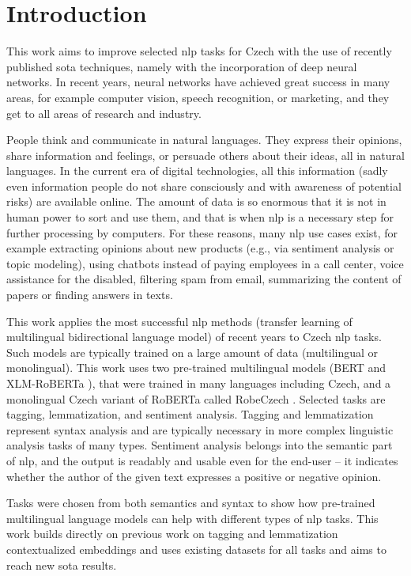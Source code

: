 \chapter*{Introduction}
This work aims to improve selected \acrfull{nlp} tasks for Czech with the use of recently published \acrlong{sota} techniques, namely with the incorporation of deep neural networks. In recent years, neural networks have achieved great success in many areas, for example computer vision, speech recognition, or marketing, and they  get to all areas of research and industry.
\par
People think and communicate in natural languages. They express their opinions, share information and feelings, or persuade others about their ideas, all in natural languages. In the current era of digital technologies, all this information (sadly even information people do not share consciously and with awareness of potential risks) are available online. The amount of data is so enormous that it is not in human power to sort and use them, and that is when \acrshort{nlp} is a necessary step for further processing by computers. For these reasons, many \acrshort{nlp} use cases exist, for example extracting opinions about new products (e.g., via sentiment analysis or topic modeling), using chatbots instead of paying employees in a call center, voice assistance for the disabled, filtering spam from email, summarizing the content of papers or finding answers in texts. \par
This work applies the most successful \gls{nlp} methods (transfer learning of multilingual bidirectional language model) of recent years to Czech \acrlong{nlp} tasks. Such models are typically trained on a large amount of data (multilingual or monolingual). This work uses two pre-trained multilingual models (BERT\citep{Devlin2019} and XLM-RoBERTa \citep{Conneau2019}), that were trained in many languages including Czech, and a monolingual Czech variant of RoBERTa called RobeCzech \citep{Straka2021}. Selected tasks are tagging, lemmatization, and sentiment analysis. Tagging and lemmatization represent syntax analysis and are typically necessary in more complex linguistic analysis tasks of many types. Sentiment analysis belongs into the semantic part of \acrshort{nlp}, and the output is readably and usable even for the end-user -- it indicates whether the author of the given text expresses a positive or negative opinion. \par
Tasks were chosen from both semantics and syntax to show how pre-trained multilingual language models can help with different types of \gls{nlp} tasks. This work builds directly on previous work on tagging and lemmatization contextualized embeddings \citep{straka2019czech} and uses existing datasets for all tasks and aims to reach new \acrfull{sota} results.
